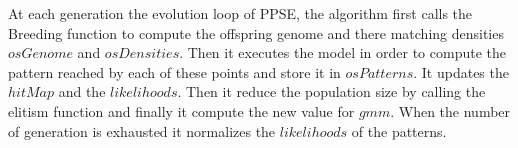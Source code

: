 \documentclass[10pt,letterpaper]{article}
\theoremstyle{definition}
\theoremstyle{remark}
\begin{document}
At each generation the evolution loop of PPSE, the algorithm first calls the Breeding function to compute the offspring genome and there matching densities $osGenome$ and $osDensities$. Then it executes the model in order to compute the pattern reached by each of these points and store it in $osPatterns$. It updates the $hitMap$ and the $likelihoods$. Then it reduce the population size by calling the elitism function and finally it compute the new value for $gmm$. When the number of generation is exhausted it normalizes the $likelihoods$ of the patterns.









\end{document}
